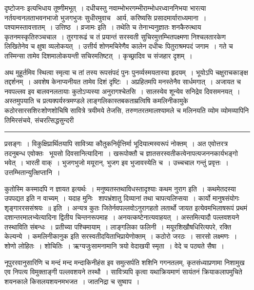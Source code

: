 \documentclass[11pt, openany]{book}
\begin{document}
\newpage

\noindent
दृष्टोजनः इत्यभिधाय तूष्णीमभूत्~। दधीचस्तु नवाम्भोभरगम्भीराम्भोधरध्वाननिभया भारत्या नर्तयन्वनलताभवनभाजो भुजगभुजः सुधीरमुवाच \textendash\ {\haq आर्य, करिष्यसि प्रसादमार्याराध्यमाना~। पश्यामस्तावत्तातम्~। उत्तिष्ठ~। व्रजामः} इति~। तथेति च तेनाभ्यनुज्ञातः शनकैरुत्थाय कृतनमस्कृतिरुञ्चचाल~। तुरगारूढं च तं प्रयान्तं सरस्वती सुचिरमुत्तम्भितपक्ष्मणा निश्चलतारकेण लिखितेनेव च क्षुषा व्यलोकयत्~। उत्तीर्य शोणमचिरेणैव कालेन दधीचः पितुराश्रमपदं जगाम~। गते च तस्मिन्सा तामेव दिशमालोकयन्ती सचिरमतिष्टत्~। कृच्छ्रादिव च संजहार दृशम्~।

अथ मुहूर्तमिव स्थित्वा स्मृत्वा च तां तस्य रूपसंपदं पुनः पुनर्व्यस्मयतास्या हृदयम्~। भूयोऽपि चक्षुराचकाङ्क्ष तद्दर्शनम्~। अवशेष केनाप्यनीयत तामेव दिशं दृष्टिः~। अप्रहितमपि मनस्तेनैव सार्धमगात्~। अजायत च नवपल्लव इव बालवनलतायाः कुतोऽप्यस्या अनुरागश्चेतसि~। सालस्येव शून्येव सनिद्रेव दिवसमनयत्~। अस्तमुपयाति च प्रत्यक्पर्यस्त्रमण्डले लाङ्गलिकास्तबकताम्रत्विषि कमलिनीकामुके कठोरसारसशिरःशोणशोचिषि सावित्रे त्रयीमये तेजसि, तरुणतरतमालश्यामले च मलिनयति व्योम व्योमव्यापिनि तिमिरसंचये, संचरत्सिद्धसुन्दरी\textendash

\vspace{2mm}
\hrule

\noindent
{\s प्रसङ्गः~। विकुक्षिप्रार्थितयापि सावित्र्या कौतुकनिर्वृत्तिर्मा भूदियात्मस्वरूपं नोक्तम्~। अत एवोत्तरत्र तदनुबन्ध एवोक्तः \textendash\ {\qtt भूयसो दिवसानित्यादिना}~। खरूपोक्तौ च ज्ञातसरस्वतीकत्वेनापत्यजननकार्यभङ्गो भवेत्~। भारती वाक्~। भुजगभुजो मयूरान्, भुजग इव भुजावस्येति च~। उच्चचाल गन्तुं प्रवृत्तः~। उत्तम्भितान्युत्क्षिप्तानि~।

कुतोस्मि कस्मादपि न ज्ञायत इत्यर्थः~। मनुष्यतस्तथाविधस्तादृश्याः कथम नुराग इति~। कथमेतदस्या उपपद्यत इति न वाच्यम्~। यदाह मुनिः \textendash\ {\qt शापभ्रंशातु दिव्यानां तथा चापत्यलिप्सया~। कार्यो मानुषसंयोगः शृङ्गाररससंश्रयः~॥} इति~। अन्यत्र कुतः जितेर्नवपल्लवोऽनुरागहतो लतार्थो जायत इत्येवमभिलाषरूपं प्रथमं दशान्तरमालभ्येत्यादिना द्वितीय चिन्तनरूपमाह~। अनयत्कष्टेनात्यवाहयत्~। अस्तमित्यादौ पल्लवशयने तस्थाविति संबन्धः~। प्रतीच्या पश्चिमायाम्~। लाङ्गलिका फलिनी~। मयूरशिखौषधिरित्यपरे, रक्ति केल्यन्ये~। कमलिनीकानुक इति सरस्वतीदयिताभिप्रायेणोक्तम्~। कठोरो जरठः~। सारसो लक्ष्मणः~। शोणो लोहितः~। शोचितिः~। {\qt ऋग्यजुःसामनामानि त्रयो वेदाखयी स्मृता~। वेदे च पठ्यते सैषा}~।}

\newpage

\noindent
नूपुररवानुसारिणि च मन्दं मन्द मन्दाकिनीहंस इव समुत्सर्पति शशिनि गगनतलम्, कृतसंध्याप्रणामा निशामुख एव निपत्य विमुक्ताङ्गी पल्लवशयने तस्थौ~। सावित्र्यपि कृत्वा यथाक्रियमाणं सायंतनं क्रियाकलापमुचिते शयनकाले किसलयशयनमभजत~। जातनिद्रा च सुष्वाप~।
\end{document}
